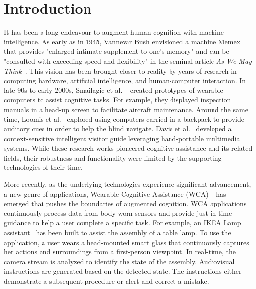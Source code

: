 \chapter{Introduction}
\label{chapter: intro}

It has been a long endeavour to augment human cognition with machine
intelligence. As early as in 1945, Vannevar Bush envisioned a machine Memex that
provides "enlarged intimate supplement to one's memory" and can be "consulted
with exceeding speed and flexibility" in the seminal article \textit{As We May
Think}~\cite{bush1945we}. This vision has been brought closer to reality by
years of research in computing hardware, artificial intelligence, and
human-computer interaction. In late 90s to early 2000s, Smailagic et al.
~\cite{smailagic1993case,smailagic1998very,smailagic2002application} created
prototypes of wearable computers to assist cognitive tasks. For example, they
displayed inspection manuals in a head-up screen to facilitate aircraft
maintenance. Around the same time, Loomis et
al.~\cite{loomis1998navigation,loomis1994personal} explored using computers
carried in a backpack to provide auditory cues in order to help the blind
navigate.  Davis et al.~\cite{davies1998developing,cheverst2000developing}
developed a context-sensitive intelligent visitor guide leveraging hand-portable
multimedia systems. While these research works pioneered cognitive assistance
and its related fields, their robustness and functionality were limited by the
supporting technologies of their time.

More recently, as the underlying technologies experience significant
advancement, a new genre of applications, Wearable Cognitive Assistance
(WCA)~\cite{ha2014towards,chen2018application}, has emerged that pushes
the boundaries of augmented cognition. WCA applications continuously process
data from body-worn sensors and provide just-in-time guidance to help a user
complete a specific task. For example, an IKEA Lamp
assistant~\cite{chen2018application} has been built to assist the assembly of a
table lamp. To use the application, a user wears a head-mounted smart glass that
continuously captures her actions and surroundings from a first-person
viewpoint. In real-time, the camera stream is analyzed to identify the state of
the assembly. Audiovisual instructions are generated based on the detected
state. The instructions either demonstrate a subsequent procedure or alert and
correct a mistake.

